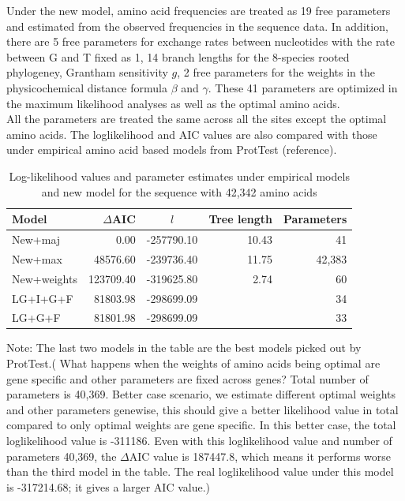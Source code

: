 \documentclass[13pt]{article}
\begin{document}
Under the new model, amino acid frequencies are treated as 19 free parameters and estimated from the observed frequencies in the sequence data.
In addition, there are 5 free parameters for exchange rates between nucleotides with the rate between G and T fixed as 1, 14 branch lengths for the 8-species rooted phylogeney, Grantham sensitivity $g$, 2 free parameters for the weights in the physicochemical distance formula $\beta$ and $\gamma$. These 41 parameters are optimized in the maximum likelihood analyses as well as the optimal amino acids.\\


All the parameters are treated the same across all the sites except the optimal amino acids.
The loglikelihood and AIC values are also compared with those under empirical amino acid based models from ProtTest (reference). \\

\begin{table}[h]
\begin{center}
\caption{Log-likelihood values and parameter estimates under empirical models and new model for the sequence with 42,342 amino acids}
\begin{tabular}{l r c r r}
\hline
Model & $\Delta$AIC & $l$ & Tree length & Parameters \\
\hline
New+maj & 0.00 & -257790.10 &  10.43 & 41 \\
New+max & 48576.60 & -239736.40 & 11.75 & 42,383 \\
New+weights & 123709.40 & -319625.80 & 2.74 & 60 \\
LG+I+G+F & 81803.98 & -298699.09 &  & 34\\
LG+G+F & 81801.98 & -298699.09 & & 33 \\
\hline
\end{tabular}
\end{center}

Note: The last two models in the table are the best models picked out by ProtTest.({\color{blue} What happens when the weights of amino acids being optimal are gene specific and other parameters are fixed across genes? Total number of parameters is 40,369.
Better case scenario, we estimate different optimal weights and other parameters genewise, this should give a better likelihood value in total compared to only optimal weights are gene specific.
In this better case, the total loglikelihood value is -311186.
Even with this loglikelihood value and number of parameters 40,369, the $\Delta$AIC value is 187447.8, which means it performs worse than the third model in the table.} The real loglikelihood value under this model is -317214.68; it gives a larger AIC value.)
\label{table:mle}
\end{table}
\end{document}
